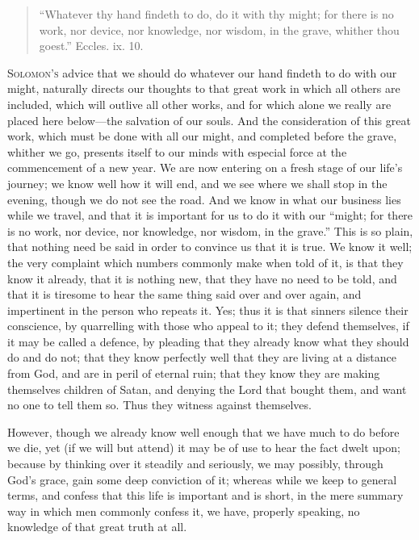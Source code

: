 
\begin{quote}

``Whatever thy hand findeth to do, do it with thy might; for
there is no work, nor device, nor knowledge, nor wisdom, in the
grave, whither thou goest.'' Eccles. ix. 10.

\end{quote}

S\textsc{olomon's} advice that we should do whatever our hand findeth to do
with our might, naturally directs our thoughts to that great work in
which all others are included, which will outlive all other works, and
for which alone we really are placed here below—the salvation of our
souls. And the consideration of this great work, which must be done
with all our might, and completed before the grave, whither we go,
presents itself to our minds with especial force at the commencement
of a new year. We are now entering on a fresh stage of our life's
journey; we know well how it will end, and we see where we
shall stop in the evening, though we do not see the road. And we know
in what our business lies while we travel, and that it is important
for us to do it with our ``might; for there is no work, nor
device, nor knowledge, nor wisdom, in the grave.'' This is so
plain, that nothing need be said in order to convince us that it is
true. We know it well; the very complaint which numbers commonly make
when told of it, is that they know it already, that it is nothing new,
that they have no need to be told, and that it is tiresome to hear the
same thing said over and over again, and impertinent in the person who
repeats it. Yes; thus it is that sinners silence their conscience, by
quarrelling with those who appeal to it; they defend themselves, if it
may be called a defence, by pleading that they already know what they
should do and do not; that they know perfectly well that they are
living at a distance from God, and are in peril of eternal ruin; that
they know they are making themselves children of Satan, and denying
the Lord that bought them, and want no one to tell them so. Thus they
witness against themselves.

However, though we already know well enough that we have much to do
before we die, yet (if we will but attend) it may be of use to hear
the fact dwelt upon; because by thinking over it steadily and
seriously, we may possibly, through God's grace, gain some deep
conviction of it; whereas while we keep to general terms, and confess
that this life is important and is short, in the mere summary way in
which men commonly confess it, we have, properly speaking, no
knowledge of that great truth at all.

